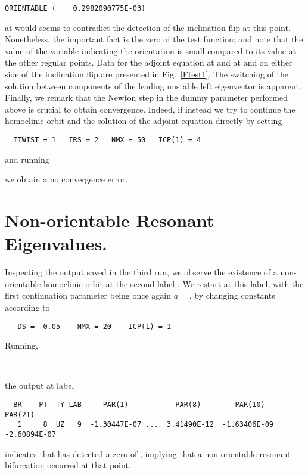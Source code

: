 \documentclass[12pt]{report}
\begin{document}
\begin{verbatim} 
ORIENTABLE (    0.2982090775E-03)
\end{verbatim}
at  would seems to contradict the 
detection of the inclination flip at this point. Nonetheless, the
important fact is the zero of the test function; and note that 
the value of the variable indicating the orientation is 
small compared to its value at the other regular points. 
Data for the adjoint equation at  and  at
and on either side of the inclination flip are presented in 
Fig.\ \ref{Ftest1}. The switching of the solution between components
of the leading unstable left eigenvector is apparent.
Finally, we remark that the Newton step in the dummy 
parameter  performed above is crucial
to obtain convergence. Indeed, if instead we try to continue the
homoclinic orbit and the solution of the adjoint equation directly by
setting
\begin{verbatim}
  ITWIST = 1   IRS = 2   NMX = 50   ICP(1) = 4
\end{verbatim}
and running
\begin{center}
\end{center}
we obtain a no convergence error.

\section{Non-orientable Resonant Eigenvalues.}
Inspecting the output saved in the third run,
we observe the existence of a non-orientable homoclinic orbit at the
second  label 
. We restart at this label, with
the first continuation parameter being once again $a=$, 
by changing constants according to 
\begin{verbatim}
   DS = -0.05    NMX = 20    ICP(1) = 1
\end{verbatim}
Running, 
 \begin{center}
\\
\end{center}
the output at label 
\begin{verbatim}
  BR    PT  TY LAB     PAR(1)           PAR(8)        PAR(10)       PAR(21)       
   1     8  UZ   9  -1.30447E-07 ...  3.41490E-12  -1.63406E-09  -2.60894E-07
\end{verbatim}
indicates that \AUTO has detected a zero of
, implying that a non-orientable resonant bifurcation
occurred at that point.
\end{document}
